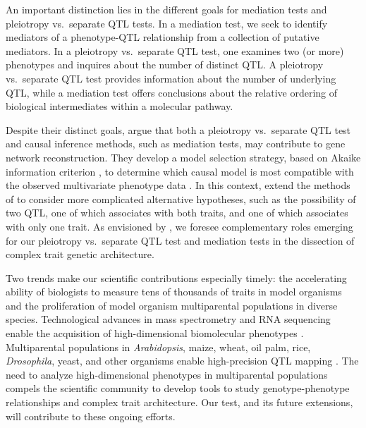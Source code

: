 \documentclass[12pt,twoside, lineno]{gsajnl}
\begin{document}
An important distinction lies in the different goals for mediation
tests and pleiotropy vs.\ separate QTL tests. In a mediation test, we
seek to identify mediators of a phenotype-QTL relationship from a
collection of putative mediators. In a pleiotropy vs.\ separate QTL
test, one examines two (or more) phenotypes and inquires about the
number of distinct QTL. A pleiotropy vs.\ separate QTL test provides
information about the number of underlying QTL, while a mediation test
offers conclusions about the relative ordering of biological
intermediates within a molecular pathway.

Despite their distinct goals, \citet{schadt2005integrative} argue that
both a pleiotropy vs.\ separate QTL test and causal inference methods,
such as mediation tests, may contribute to gene network
reconstruction. They develop a model selection strategy, based on
Akaike information criterion \citep{akaike1974new}, to determine which
causal model is most compatible with the observed multivariate
phenotype data \citep{schadt2005integrative}. In this context,
\citet{schadt2005integrative} extend the methods of
\citet{jiang1995multiple} to consider more complicated alternative
hypotheses, such as the possibility of two QTL, one of which
associates with both traits, and one of which associates with only one
trait. As envisioned by \citet{schadt2005integrative}, we foresee
complementary roles emerging for our pleiotropy vs.\ separate QTL test
and mediation tests in the dissection of complex trait genetic
architecture.

Two trends make our scientific contributions especially timely: the
accelerating ability of biologists to measure tens of thousands of
traits in model organisms and the proliferation of model organism
multiparental populations in diverse species. Technological advances
in mass spectrometry and RNA sequencing enable the acquisition of
high-dimensional biomolecular phenotypes
\citep{ozsolak2011rna,han2012multi}. Multiparental populations in
\textit{Arabidopsis}, maize, wheat, oil palm, rice,
\textit{Drosophila}, yeast, and other organisms enable high-precision
QTL mapping \citep{yu2008genetic, tisne2017identification,
  stanley2017genetic, raghavan2017approaches, mackay2012drosophila,
  kover2009multiparent, cubillos2013high}. The need to analyze
high-dimensional phenotypes in multiparental populations compels the
scientific community to develop tools to study genotype-phenotype
relationships and complex trait architecture. Our test, and its future
extensions, will contribute to these ongoing efforts.
\end{document}
